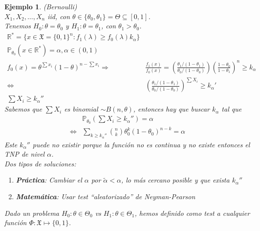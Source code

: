 \documentclass[10pt]{article}
\theoremstyle{plain}
\newtheorem{ej}{Ejemplo}
\theoremstyle{definition}
\begin{document}
\begin{ej} (Bernoulli)\\
$X_{1}, X_{2}, \ldots, X_{n}$ iid, con $\theta \in \{\theta_{0},\theta_{1}\} = \Theta \subseteq [0,1]$.\\
Tenemos $H_{0}: \theta = \theta_{0}$ y $H_{1}: \theta = \theta_{1}$, con $\theta_{1}>\theta_{0}$.
\begin{align*}
\mathbb{R}^* = \{x \in \mathfrak{X} = \{0,1\}^n\colon f_{1}(\lambda) \ge f_{0}(\lambda)k_{\alpha}\}\\
\mathbb{P}_{\theta_{0}}(x \in \mathbb{R}^*) = \alpha, \alpha \in (0,1)\\
f_{0}(x) = \theta^{\sum x_{i}}(1-\theta)^{n-\sum x_{i}} \Rightarrow & \frac{f_{1}(x)}{f_{0}(x)} = \left(\frac{\theta_{1}/(1-\theta_{1})}{\theta_{0}/(1-\theta_{0})}\right)\left(\frac{1-\theta_{0}}{1-\theta_{1}}\right)^n \ge k_{\alpha}\\
\Leftrightarrow & \left(\frac{\theta_{1}/(1-\theta_{1})}{\theta_{0}/(1-\theta_{0})}\right)^{\sum X_{i}} \ge k_{\alpha}'\\
\sum X_{i} \ge k_{\alpha}''
\end{align*}
Sabemos que $\sum X_{i}$ es binomial $\sim B(n,\theta)$, entonces hay que buscar $k_{\alpha}$ tal que 
\begin{align*}
&\mathbb{P}_{\theta_{0}}\left(\sum X_{i} \ge k_{\alpha}''\right) = \alpha\\
\Leftrightarrow &\sum_{k\ge k_{\alpha}''} \binom{n}{k} \theta_{0}^k (1-\theta_{0})^{n-k} = \alpha
\end{align*}
Este $k_{\alpha}''$ puede no existir porque la función no es continua y no existe entonces el TNP de nivel $\alpha$.\\

Dos tipos de soluciones:
\begin{enumerate}
\item \textbf{Práctica}: Cambiar el $\alpha$ por $\tilde{\alpha}<\alpha$, lo más cercano posible y que exista $k_{\alpha}''$
\item \textbf{Matemática}: Usar test ``aleatorizado'' de Neyman-Pearson
\end{enumerate}
Dado un problema $H_{0}: \theta \in \Theta_{0}$ vs $H_{1}: \theta \in \Theta_{1}$, hemos definido como test a cualquier función $\Phi : \mathfrak{X} \mapsto \{0,1\}$.\\


\end{ej}
\end{document}
